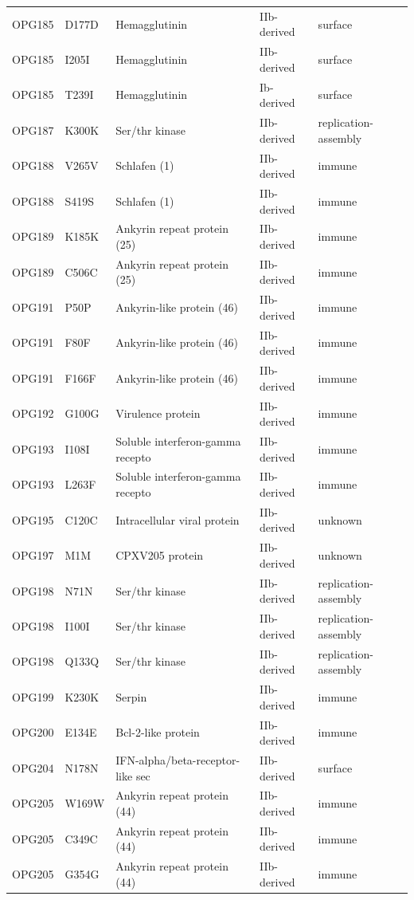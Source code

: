 \documentclass[11pt]{article}
\begin{document}
\begin{longtable}{lllll}
OPG185 & D177D & Hemagglutinin & IIb-derived & surface \\
OPG185 & I205I & Hemagglutinin & IIb-derived & surface \\
OPG185 & T239I & Hemagglutinin & Ib-derived & surface \\
OPG187 & K300K & Ser/thr kinase & IIb-derived & replication-assembly \\
OPG188 & V265V & Schlafen (1) & IIb-derived & immune \\
OPG188 & S419S & Schlafen (1) & IIb-derived & immune \\
OPG189 & K185K & Ankyrin repeat protein (25) & IIb-derived & immune \\
OPG189 & C506C & Ankyrin repeat protein (25) & IIb-derived & immune \\
OPG191 & P50P & Ankyrin-like protein (46) & IIb-derived & immune \\
OPG191 & F80F & Ankyrin-like protein (46) & IIb-derived & immune \\
OPG191 & F166F & Ankyrin-like protein (46) & IIb-derived & immune \\
OPG192 & G100G & Virulence protein & IIb-derived & immune \\
OPG193 & I108I & Soluble interferon-gamma recepto & IIb-derived & immune \\
OPG193 & L263F & Soluble interferon-gamma recepto & IIb-derived & immune \\
OPG195 & C120C & Intracellular viral protein & IIb-derived & unknown \\
OPG197 & M1M & CPXV205 protein & IIb-derived & unknown \\
OPG198 & N71N & Ser/thr kinase & IIb-derived & replication-assembly \\
OPG198 & I100I & Ser/thr kinase & IIb-derived & replication-assembly \\
OPG198 & Q133Q & Ser/thr kinase & IIb-derived & replication-assembly \\
OPG199 & K230K & Serpin & IIb-derived & immune \\
OPG200 & E134E & Bcl-2-like protein & IIb-derived & immune \\
OPG204 & N178N & IFN-alpha/beta-receptor-like sec & IIb-derived & surface \\
OPG205 & W169W & Ankyrin repeat protein (44) & IIb-derived & immune \\
OPG205 & C349C & Ankyrin repeat protein (44) & IIb-derived & immune \\
OPG205 & G354G & Ankyrin repeat protein (44) & IIb-derived & immune \\

\end{longtable}
\end{document}
